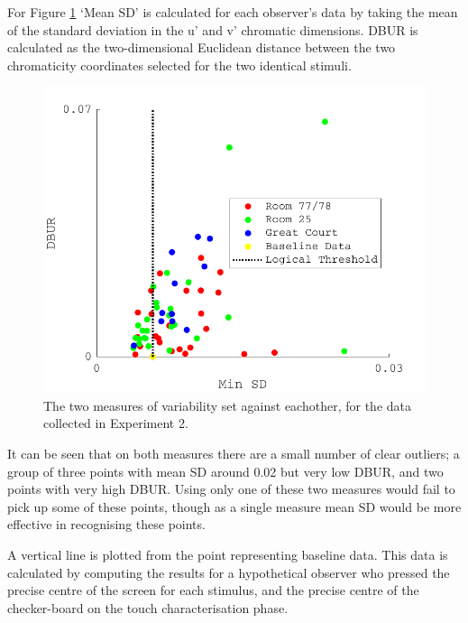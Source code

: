 For Figure \ref{fig:excl1} `Mean SD' is calculated for each observer's data by taking the mean of the standard deviation in the u' and v' chromatic dimensions. \gls{DBUR} is calculated as the two-dimensional Euclidean distance between the two chromaticity coordinates selected for the two identical stimuli.

\begin{figure}[hbtp] %
\includegraphics[max width=\textwidth]{figs/tablet/excl1.pdf} 
\caption{The two measures of variability set against eachother, for the data collected in Experiment 2.}
\label{fig:excl1}
\end{figure}

It can be seen that on both measures there are a small number of clear outliers; a group of three points with mean SD around 0.02 but very low \gls{DBUR}, and two points with very high \gls{DBUR}. Using only one of these two measures would fail to pick up some of these points, though as a single measure mean SD would be more effective in recognising these points.

A vertical line is plotted from the point representing baseline data. This data is calculated by computing the results for a hypothetical observer who pressed the precise centre of the screen for each stimulus, and the precise centre of the checker-board on the touch characterisation phase. 

